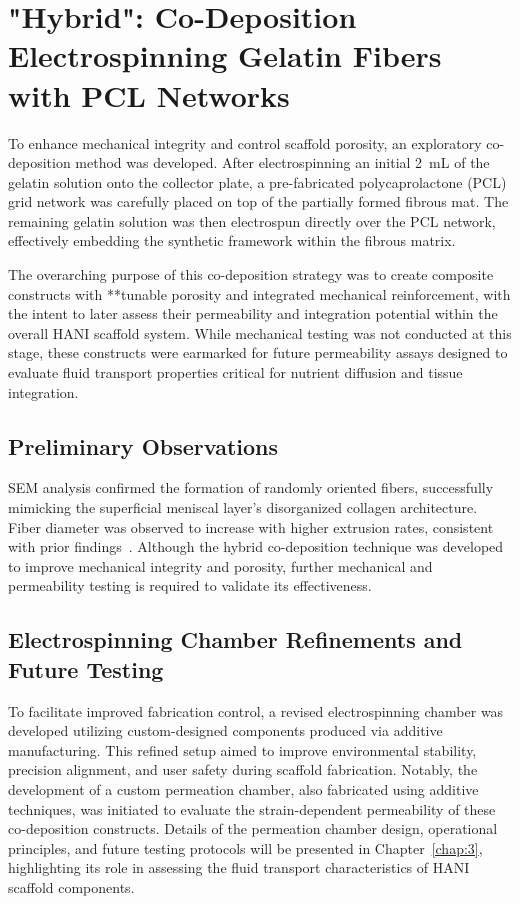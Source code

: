 \newpage

\section{"Hybrid": Co-Deposition Electrospinning Gelatin Fibers with PCL Networks} \label{sec:ch2_electrospinning}

To enhance mechanical integrity and control scaffold porosity, an exploratory co-deposition method was developed. After electrospinning an initial 2~mL of the gelatin solution onto the collector plate, a pre-fabricated polycaprolactone (PCL) grid network was carefully placed on top of the partially formed fibrous mat. The remaining gelatin solution was then electrospun directly over the PCL network, effectively embedding the synthetic framework within the fibrous matrix.

The overarching purpose of this co-deposition strategy was to create composite constructs with **tunable porosity and integrated mechanical reinforcement, with the intent to later assess their permeability and integration potential within the overall HANI scaffold system. While mechanical testing was not conducted at this stage, these constructs were earmarked for future permeability assays designed to evaluate fluid transport properties critical for nutrient diffusion and tissue integration.

\subsection{Preliminary Observations}

SEM analysis confirmed the formation of randomly oriented fibers, successfully mimicking the superficial meniscal layer's disorganized collagen architecture. Fiber diameter was observed to increase with higher extrusion rates, consistent with prior findings~\cite{schneider2018codepositionhydrogel, park2003biomaterialsprinciples,rahmati2021electrospinningtissue,zhang2005electrospinninggelatin}. Although the hybrid co-deposition technique was developed to improve mechanical integrity and porosity, further mechanical and permeability testing is required to validate its effectiveness.

\subsection{Electrospinning Chamber Refinements and Future Testing}

To facilitate improved fabrication control, a revised electrospinning chamber was developed utilizing custom-designed components produced via additive manufacturing. This refined setup aimed to improve environmental stability, precision alignment, and user safety during scaffold fabrication. Notably, the development of a custom permeation chamber, also fabricated using additive techniques, was initiated to evaluate the strain-dependent permeability of these co-deposition constructs. Details of the permeation chamber design, operational principles, and future testing protocols will be presented in Chapter~\ref{chap:3}, highlighting its role in assessing the fluid transport characteristics of HANI scaffold components.

